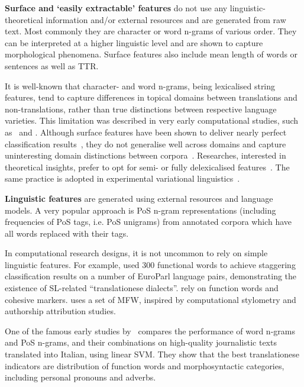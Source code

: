 \textbf{Surface and `easily extractable' features} do not use any linguistic-theoretical information and/or external resources and are generated from raw text. Most commonly they are character or word n-grams of various order. They can be interpreted at a higher linguistic level and are shown to capture morphological phenomena.
Surface features also include mean length of words or sentences as well as \gls{TTR}. 

It is well-known that character- and word n-grams, being lexicalised string features, tend to capture differences in topical domains between translations and non-translations, rather than true distinctions between respective language varieties. This limitation was described in very early computational studies, such as~\citet{Baroni2005} and \citet{VanHalteren2008}. Although surface features have been shown to deliver nearly perfect classification results~\cite{Popescu2011}, they do not generalise well across domains and capture uninteresting domain distinctions between corpora~\cite{Eetemadi2015}. Researches, interested in theoretical insights, prefer to opt for semi- or fully delexicalised features~\cite{Lapshinova2018,Nikolaev2020,Hu2021}. The same practice is adopted in experimental variational linguistics~\cite{Diwersy2014}.

\textbf{Linguistic features} are generated using external resources and language models. A very popular approach is \gls{PoS} n-gram representations (including frequencies of PoS tags, i.e. PoS unigrams) from annotated corpora which have all words replaced with their tags. 

In computational research designs, it is not uncommon to rely on simple linguistic features. For example, \citet{Koppel2011} used 300 functional words to achieve staggering classification results on a number of EuroParl language pairs, demonstrating the existence of SL-related ``translationese dialects''. \citet{Rabinovich2015} rely on function words and cohesive markers. \citet{Nisioi2013} uses a set of \gls{MFW}, inspired by computational stylometry and authorship attribution studies.

One of the famous early studies by~\citet{Baroni2006} compares the performance of word n-grams and PoS n-grams, and their combinations on high-quality journalistic texts translated into Italian, using linear \gls{SVM}. They show that the best translationese indicators are distribution of function words and morphosyntactic categories, including personal pronouns and adverbs.

